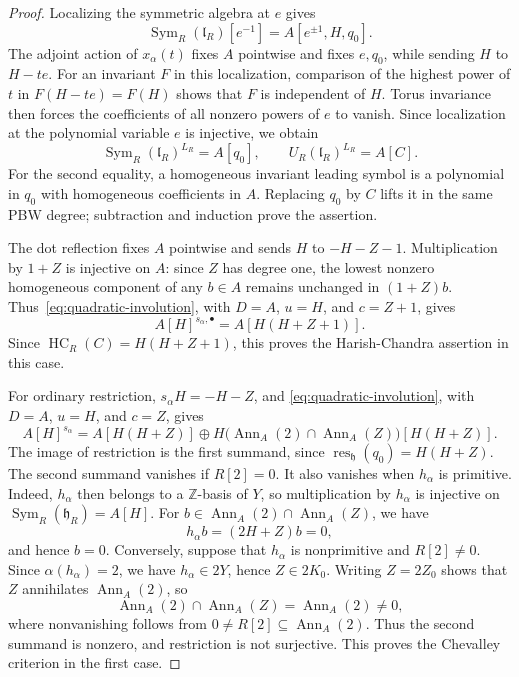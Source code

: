 \documentclass[twoside,a4paper,12pt,reqno]{amsart}
\theoremstyle{remark}
\numberwithin{equation}{section}
\newcommand{\Z}{\mathbb Z}
\newcommand{\fh}{\mathfrak h}
\newcommand{\fl}{\mathfrak l}
\DeclareMathOperator{\Sym}{Sym}
\DeclareMathOperator{\HC}{HC}
\DeclareMathOperator{\Ann}{Ann}
\begin{document}
\begin{proof}
Localizing the symmetric algebra at \(e\) gives
\[
\Sym_R(\fl_R)[e^{-1}]=A[e^{\pm1},H,q_0].
\]
The adjoint action of \(x_\alpha(t)\) fixes \(A\) pointwise and fixes
\(e,q_0\), while sending \(H\) to \(H-te\).
For an invariant \(F\) in this localization, comparison
of the highest power of \(t\) in \(F(H-te)=F(H)\) shows that \(F\)
is independent of \(H\). Torus invariance then forces the coefficients
of all nonzero powers of \(e\) to vanish.
Since localization at the polynomial variable \(e\) is
injective, we obtain
\begin{equation}\label{eq:rankone-first-image}
\Sym_R(\fl_R)^{L_R}=A[q_0],\qquad
U_R(\fl_R)^{L_R}=A[C].
\end{equation}
For the second equality, a homogeneous invariant leading symbol is
a polynomial in \(q_0\) with homogeneous coefficients in \(A\).
Replacing \(q_0\) by \(C\) lifts it in the same PBW degree;
subtraction and induction prove the assertion.

The dot reflection fixes \(A\) pointwise and sends \(H\) to \(-H-Z-1\).
Multiplication by \(1+Z\) is injective on \(A\): since \(Z\) has degree one,
the lowest nonzero homogeneous component of any \(b\in A\) remains unchanged
in \((1+Z)b\).
Thus~\eqref{eq:quadratic-involution}, with \(D=A\), \(u=H\), and
\(c=Z+1\), gives
\[
A[H]^{s_\alpha,\bullet}=A[H(H+Z+1)].
\]
Since \(\HC_R(C)=H(H+Z+1)\), this proves the Harish-Chandra assertion
in this case.

For ordinary restriction, \(s_\alpha H=-H-Z\), and
\eqref{eq:quadratic-involution}, with \(D=A\), \(u=H\), and \(c=Z\),
gives
\[
A[H]^{s_\alpha}=A[H(H+Z)]\oplus
H\bigl(\Ann_A(2)\cap\Ann_A(Z)\bigr)[H(H+Z)].
\]
The image of restriction is the first summand, since
\(\operatorname{res}_{\fh}(q_0)=H(H+Z)\).
The second summand vanishes if \(R[2]=0\).
It also vanishes when \(h_\alpha\) is primitive. Indeed, \(h_\alpha\)
then belongs to a \(\Z\)-basis of \(Y\), so multiplication by
\(h_\alpha\) is injective on \(\Sym_R(\fh_R)=A[H]\).
For \(b\in\Ann_A(2)\cap\Ann_A(Z)\), we have
\[
h_\alpha b=(2H+Z)b=0,
\]
and hence \(b=0\).
Conversely, suppose that \(h_\alpha\) is nonprimitive and \(R[2]\ne0\).
Since \(\alpha(h_\alpha)=2\), we have \(h_\alpha\in2Y\), hence
\(Z\in2K_0\). Writing \(Z=2Z_0\) shows that \(Z\) annihilates
\(\Ann_A(2)\), so
\[
\Ann_A(2)\cap\Ann_A(Z)=\Ann_A(2)\ne0,
\]
where nonvanishing follows from \(0\ne R[2]\subseteq\Ann_A(2)\).
Thus the second summand is nonzero, and restriction is not surjective.
This proves the Chevalley criterion in the first case.


\end{proof}
\end{document}
